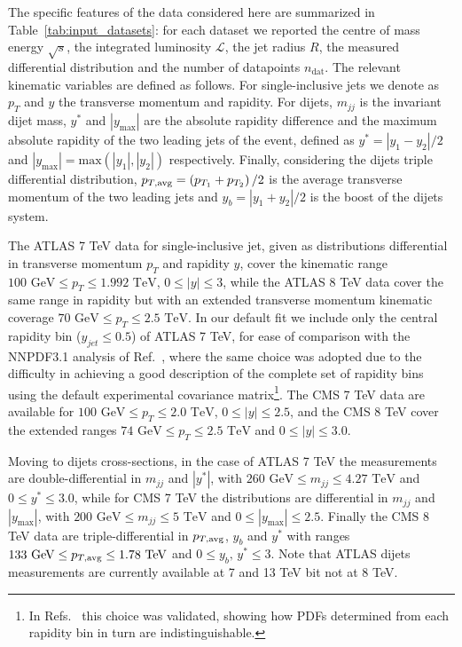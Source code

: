 %
The specific features of the data considered here are summarized in Table~\ref{tab:input_datasets}:
for each dataset we reported the centre of mass energy $\sqrt{s}$, 
the integrated luminosity $\mathcal{L}$, the jet radius $R$,
the measured differential distribution and the number of datapoints $n_{\text{dat}}$.
The relevant kinematic variables are defined as follows.
For single-inclusive jets we denote as $p_T$ and $y$ the transverse momentum and rapidity.
For dijets, $m_{jj}$ is the invariant dijet mass, $y^*$ and $|y_{\text{max}}|$ are the absolute rapidity difference
and the maximum absolute rapidity of the two leading jets of the event, defined as $y^*=|y_1-y_2|/2$
and $|y_{\text{max}}|= \text{max}\left(|y_1|,|y_2|\right)$ respectively.
Finally, considering the dijets triple differential distribution,
$p_{T,\rm avg} = \left(p_{T_1}+p_{T_2}\right)/2$ is the average transverse momentum of the two leading jets and 
$y_b = |y_1+y_2|/2$ is the boost of the dijets system.

%
The ATLAS 7 TeV data for single-inclusive jet, given as distributions differential in transverse momentum 
$p_T$ and rapidity $y$, cover the kinematic range $100\,\, \text{GeV} \leq p_T \leq 1.992\,\, \text{TeV}$,
$0 \leq |y| \leq 3$, while the ATLAS 8 TeV data cover the same range in rapidity but with an extended transverse momentum
kinematic coverage $70\,\, \text{GeV} \leq p_T \leq 2.5\,\, \text{TeV}$.
In our default fit we include only the central rapidity bin ($y_{jet} \leq 0.5$) of ATLAS 7 TeV, 
for ease of comparison with the NNPDF3.1 analysis of Ref.~, where the same choice was adopted due to
the difficulty in achieving a good description of the complete set of rapidity bins using
the default experimental covariance matrix\footnote{In Refs.~\cite{Ball:2017nwa,Nocera:2017zge} this choice was validated,
showing how PDFs determined from each rapidity bin in turn are indistinguishable.}.
The CMS 7 TeV data are available for $100\,\, \text{GeV} \leq p_T \leq 2.0\,\, \text{TeV}$,
$0 \leq |y| \leq 2.5$, and the CMS 8 TeV cover the extended
ranges $74\,\, \text{GeV} \leq p_T \leq 2.5\,\, \text{TeV}$ and $0 \leq |y| \leq 3.0$.

%
Moving to dijets cross-sections, in the case of ATLAS 7 TeV the measurements are double-differential in
$m_{jj}$ and $|y^*|$, with
$260\,\,\text{GeV}\leq m_{jj} \leq 4.27\,\,\text{TeV}$ and $0 \leq y^* \leq 3.0$, while for CMS 7 TeV
the distributions are differential in  $m_{jj}$ and $|y_{\text{max}}|$, with
$200\,\,\text{GeV}\leq m_{jj} \leq 5\,\,\text{TeV}$ and $0 \leq |y_{\text{max}}| \leq 2.5$.  
Finally the CMS 8 TeV data are triple-differential in $p_{T,\rm avg}$, $y_b$ and $y^*$ with
ranges $133\,\,\text{GeV} \leq p_{T,\rm avg} \leq 1.78\,\,\text{TeV}$ and $0\leq y_b,\,y^* \leq 3$.
Note that ATLAS dijets measurements are currently available at 7 and 13 TeV bit not at 8 TeV.


